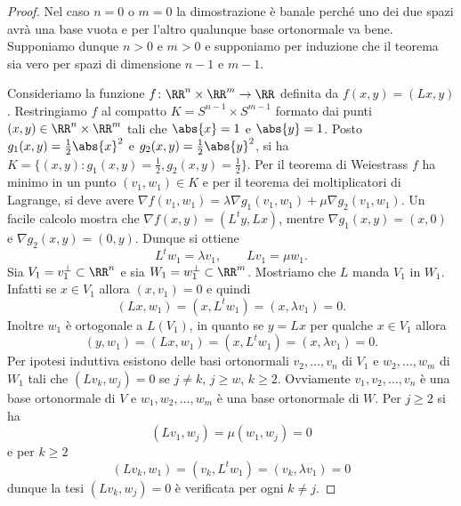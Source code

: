 \begin{proof}
Nel caso $n=0$ o $m=0$ la dimostrazione è banale perché uno dei due spazi 
avrà una base vuota e per l'altro qualunque base ortonormale va bene. 
Supponiamo dunque $n>0$ e $m>0$ e supponiamo per induzione 
che il teorema sia vero per spazi di dimensione $n-1$ e $m-1$.

Consideriamo la funzione $f\colon \RR^n\times \RR^m \to \RR$ definita da
$f(x,y) = (L x, y)$.
Restringiamo $f$ al compatto $K=S^{n-1}\times S^{m-1}$
formato dai punti $(x,y)\in\RR^n\times \RR^m$ tali che $\abs{x} = 1$ e $\abs{y} = 1$.
Posto $g_1(x,y) = \frac 1 2 \abs{x}^2$ e $g_2(x,y) = \frac 1 2 \abs{y}^2$,
si ha $K=\{(x,y) \colon g_1(x,y) = \frac 1 2, g_2(x,y) = \frac 1 2\}$.
Per il teorema di Weiestrass $f$ ha minimo in un punto $(v_1,w_1)\in K$ 
e per il teorema dei moltiplicatori di Lagrange, si deve avere
$\nabla f(v_1,w_1) = \lambda \nabla g_1(v_1,w_1) + \mu \nabla g_2(v_1,w_1)$.
Un facile calcolo mostra che $\nabla f(x,y) = (L^t y, L x)$,
mentre $\nabla g_1(x,y) = (x,0)$ e $\nabla g_2(x,y) = (0,y)$. 
Dunque si ottiene
\[
L^t w_1 = \lambda v_1, \qquad L v_1 = \mu w_1.
\]
Sia $V_1 = v_1^\perp \subset \RR^n$ e sia $W_1 = w_1^\perp \subset \RR^m$.
Mostriamo che $L$ manda $V_1$ in $W_1$. 
Infatti se $x\in V_1$ allora $(x,v_1) = 0$ e quindi
\[
(L x, w_1) = (x, L^t w_1) = (x, \lambda v_1) = 0.
\]
Inoltre $w_1$ è ortogonale a $L(V_1)$, in quanto 
se $y = L x$ per qualche $x\in V_1$ allora
\[
(y,w_1) = (L x, w_1) = (x, L^t w_1) = (x, \lambda v_1) = 0.
\]
Per ipotesi induttiva esistono delle basi ortonormali $v_2,\dots, v_n$ di $V_1$ 
e $w_2,\dots,w_m$ di $W_1$ tali che
$(L v_k, w_j) = 0$ se $j\neq k$, $j\ge w$, $k\ge 2$.
Ovviamente $v_1,v_2,\dots, v_n$ è una base ortonormale di $V$ e
$w_1,w_2,\dots,w_m$ è una base ortonormale di $W$.
Per $j\ge 2$ si ha 
\[   
  (L v_1, w_j) = \mu (w_1, w_j) = 0 
\]
e per $k\ge 2$ 
\[
  (L v_k, w_1) = (v_k, L^t w_1) = (v_k, \lambda v_1) = 0
\]
dunque la tesi $(L v_k, w_j) = 0$ è verificata per ogni $k\neq j$.
\end{proof}


